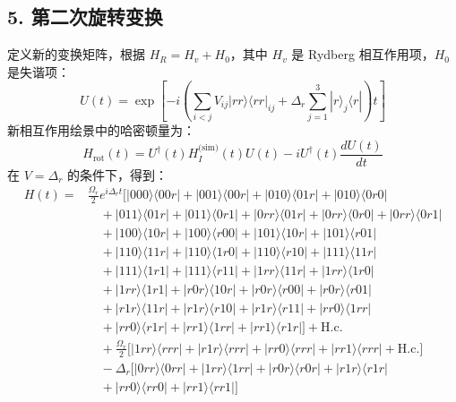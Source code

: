 \documentclass[12pt]{article}
\begin{document}
	\subsection*{5. 第二次旋转变换}
	定义新的变换矩阵，根据 $H_R = H_v + H_0$，其中 $H_v$ 是 Rydberg 相互作用项，$H_0$ 是失谐项：
	\begin{equation}
		U(t) = \exp\left[-i \left( \sum_{i<j} V_{ij} |rr\rangle\langle rr|_{ij} + \Delta_r \sum_{j=1}^3 |r\rangle_j\langle r| \right) t \right]
	\end{equation}
	新相互作用绘景中的哈密顿量为：
	\begin{equation}
		H_{\text{rot}}(t) = U^\dagger(t) H_I^{\text{(sim)}}(t) U(t) - i U^\dagger(t) \frac{dU(t)}{dt}
	\end{equation}
	在 $V = \Delta_r$ 的条件下，得到：
	\begin{equation}
		\begin{aligned}
			H(t) = &\frac{\Omega_r}{2}e^{i\Delta_r t}\Big[|000\rangle\langle 00r| + |001\rangle\langle 00r| + |010\rangle\langle 01r| + |010\rangle\langle 0r0| \\
			&\quad + |011\rangle\langle 01r| + |011\rangle\langle 0r1| + |0rr\rangle\langle 01r| + |0rr\rangle\langle 0r0| + |0rr\rangle\langle 0r1| \\
			&\quad + |100\rangle\langle 10r| + |100\rangle\langle r00| + |101\rangle\langle 10r| + |101\rangle\langle r01| \\
			&\quad + |110\rangle\langle 11r| + |110\rangle\langle 1r0| + |110\rangle\langle r10| + |111\rangle\langle 11r| \\
			&\quad + |111\rangle\langle 1r1| + |111\rangle\langle r11| + |1rr\rangle\langle 11r| + |1rr\rangle\langle 1r0| \\
			&\quad + |1rr\rangle\langle 1r1| + |r0r\rangle\langle 10r| + |r0r\rangle\langle r00| + |r0r\rangle\langle r01| \\
			&\quad + |r1r\rangle\langle 11r| + |r1r\rangle\langle r10| + |r1r\rangle\langle r11| + |rr0\rangle\langle 1rr| \\
			&\quad + |rr0\rangle\langle r1r| + |rr1\rangle\langle 1rr| + |rr1\rangle\langle r1r|\Big] + \mathrm{H.c.} \\
			&\quad + \frac{\Omega_r}{2}\Big[|1rr\rangle\langle rrr| + |r1r\rangle\langle rrr| + |rr0\rangle\langle rrr| + |rr1\rangle\langle rrr| + \mathrm{H.c.}\Big] \\
			&\quad - \Delta_r\Big[|0rr\rangle\langle 0rr| + |1rr\rangle\langle 1rr| + |r0r\rangle\langle r0r| + |r1r\rangle\langle r1r| \\
			&\quad + |rr0\rangle\langle rr0| + |rr1\rangle\langle rr1|\Big]
		\end{aligned}
	\end{equation}
	
\end{document}

